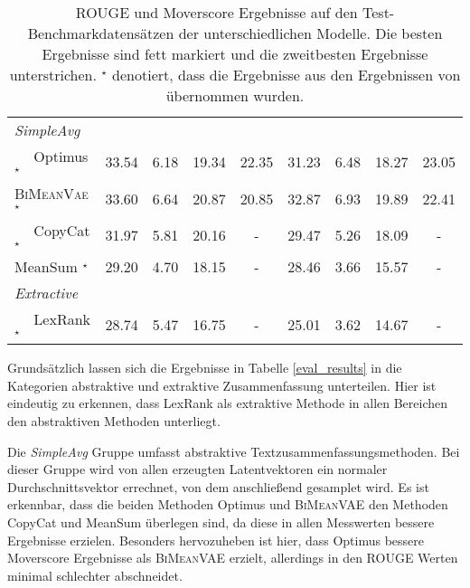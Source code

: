 \begin{table}[!h]
\begin{tabular}{@{}lcccccccc@{}}
    \textit{SimpleAvg}         &         &         &        &      &  &        &        \\
    $\quad$ Optimus  $^{\star}$          & 33.54   & 6.18    & 19.34 & 22.35& 31.23  & 6.48   & 18.27 & 23.05\\
    $\quad$ \textsc{BiMeanVae}$^{\star}$ & 33.60   & 6.64    & 20.87 & 20.85& 32.87  & 6.93   & 19.89 & 22.41\\
    $\quad$ CopyCat  $^{\star}$          & 31.97   & 5.81    & 20.16 &- & 29.47  & 5.26   & 18.09 & -\\ 
    $\quad$ MeanSum  $^{\star}$          & 29.20   & 4.70    & 18.15 & -& 28.46  & 3.66   & 15.57 & -\\ \midrule
    \textit{Extractive}        &         &         &        &      &  &        &  &      \\
    $\quad$ LexRank  $^{\star}$          & 28.74   & 5.47    & 16.75 & -& 25.01  & 3.62   & 14.67 & -\\ \bottomrule
    \end{tabular}
    \caption{ROUGE und Moverscore Ergebnisse auf den Test-Benchmarkdatensätzen der unterschiedlichen Modelle. Die besten Ergebnisse sind fett markiert und die zweitbesten Ergebnisse unterstrichen.
    $^{\star}$ denotiert, dass die Ergebnisse aus den Ergebnissen von \citep{coop} übernommen wurden.
    }
\end{table}

Grundsätzlich lassen sich die Ergebnisse in Tabelle \ref{eval_results} in die Kategorien abstraktive und extraktive Zusammenfassung unterteilen.
Hier ist eindeutig zu erkennen, dass LexRank als extraktive Methode in allen Bereichen den abstraktiven Methoden unterliegt.

Die \textit{SimpleAvg} Gruppe umfasst abstraktive Textzusammenfassungsmethoden. 
Bei dieser Gruppe wird von allen erzeugten Latentvektoren ein normaler Durchschnittsvektor errechnet, von dem anschließend gesamplet wird.
Es ist erkennbar, dass die beiden Methoden Optimus und \textsc{BiMeanVAE} den Methoden CopyCat und MeanSum überlegen sind, da diese in allen Messwerten bessere Ergebnisse erzielen.
Besonders hervozuheben ist hier, dass Optimus bessere Moverscore Ergebnisse als \textsc{BiMeanVAE} erzielt, allerdings in den ROUGE Werten minimal schlechter abschneidet.

